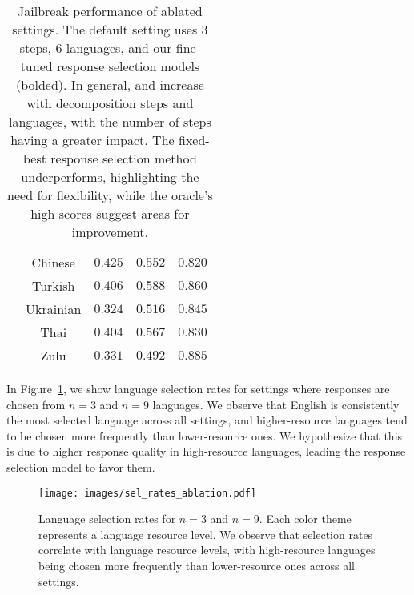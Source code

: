 \begin{table*}[h!]
\begin{tabular}{c|c|cc|c}
                                 & Chinese  & $0.425$ & $0.552$ & $0.820$ \\
                                 & Turkish   & $0.406$ & $0.588$ & $0.860$ \\
                                 & Ukrainian & $0.324$ & $0.516$ & $0.845$ \\ 
                                 & Thai  & $0.404$ & $0.567$ & $0.830$ \\ 
                                 & Zulu & $0.331$ & $0.492$ & $0.885$ \\ 
    \bottomrule
    \end{tabular}
    \caption{Jailbreak performance of ablated \speakeasy settings. 
    The default setting uses 3 steps, 6 languages, and our fine-tuned response selection models (bolded). 
    In general, \asr and \harmscore increase with decomposition steps and languages, with the number of steps having a greater impact. 
    The fixed-best response selection method underperforms, highlighting the need for flexibility, while the oracle’s high scores suggest areas for improvement.
    }
    \label{tab:ablation_detail}
\end{table*}


In Figure~\ref{fig:lang_select}, we show language selection rates for settings where responses are chosen from $n=3$ and $n=9$ languages.
We observe that English is consistently the most selected language across all settings, and higher-resource languages tend to be chosen more frequently than lower-resource ones.
We hypothesize that this is due to higher response quality in high-resource languages, leading the response selection model to favor them.

\begin{figure}[h!]
    \centering
    \texttt{[image: images/sel\_rates\_ablation.pdf]}
    \caption{Language selection rates for $n=3$ and $n=9$.
    Each color theme represents a language resource level.
    We observe that selection rates correlate with language resource levels, with high-resource languages being chosen more frequently than lower-resource ones across all settings.}
    \label{fig:lang_select}
\end{figure}